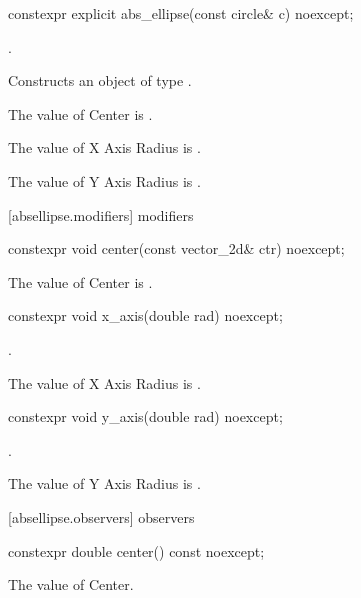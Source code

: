 \begin{itemdecl}
constexpr explicit abs_ellipse(const circle& c) noexcept;
\end{itemdecl}
\begin{itemdescr}
\pnum
\preconditions
{}.

\pnum
\effects
Constructs an object of type .

\pnum
The value of Center is .

\pnum
The value of X Axis Radius is .

\pnum
The value of Y Axis Radius is .
\end{itemdescr}

 [absellipse.modifiers]{ modifiers}

\begin{itemdecl}
constexpr void center(const vector_2d& ctr) noexcept;
\end{itemdecl}

\begin{itemdescr}
\pnum
\effects
The value of Center is .
\end{itemdescr}

\begin{itemdecl}
constexpr void x_axis(double rad) noexcept;
\end{itemdecl}
\begin{itemdescr}
\preconditions
{}.

\pnum
\effects
The value of X Axis Radius is .
\end{itemdescr}

\begin{itemdecl}
constexpr void y_axis(double rad) noexcept;
\end{itemdecl}
\begin{itemdescr}
\preconditions
{}.

\pnum
\effects
The value of Y Axis Radius is .
\end{itemdescr}

 [absellipse.observers]{ observers}

\begin{itemdecl}
constexpr double center() const noexcept;
\end{itemdecl}
\begin{itemdescr}
\pnum
\returns
The value of Center.
\end{itemdescr}

